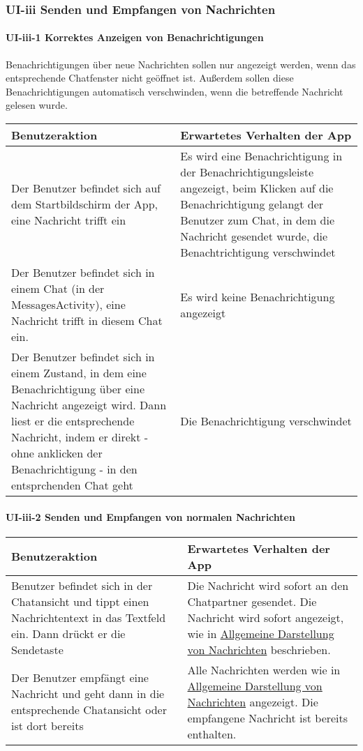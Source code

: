 
\clearpage
\subsubsection{UI-iii Senden und Empfangen von Nachrichten}

\paragraph{UI-iii-1 Korrektes Anzeigen von Benachrichtigungen}

Benachrichtigungen über neue Nachrichten sollen nur angezeigt werden, wenn das entsprechende Chatfenster nicht geöffnet ist. Außerdem sollen diese Benachrichtigungen automatisch verschwinden, wenn die betreffende Nachricht gelesen wurde.

\begin{longtable}{|p{8cm}|p{8.5cm}|}
\hline
Benutzeraktion & Erwartetes Verhalten der App\tabularnewline
\hline

Der Benutzer befindet sich auf dem Startbildschirm der App, eine
Nachricht trifft ein & Es wird eine Benachrichtigung in der
Benachrichtigungsleiste angezeigt, beim Klicken auf die Benachrichtigung
gelangt der Benutzer zum Chat, in dem die Nachricht gesendet wurde, die
Benachtrichtigung verschwindet\tabularnewline
Der Benutzer befindet sich in einem Chat (in der MessagesActivity), eine
Nachricht trifft in diesem Chat ein. & Es wird keine Benachrichtigung
angezeigt\tabularnewline
Der Benutzer befindet sich in einem Zustand, in dem eine
Benachrichtigung über eine Nachricht angezeigt wird. Dann liest er die
entsprechende Nachricht, indem er direkt - ohne anklicken der
Benachrichtigung - in den entsprchenden Chat geht & Die Benachrichtigung
verschwindet\tabularnewline
\hline
\end{longtable}

\paragraph{UI-iii-2 Senden und Empfangen von normalen Nachrichten}

\begin{longtable}{|p{8cm}|p{8.5cm}|}
\hline
Benutzeraktion & Erwartetes Verhalten der App\tabularnewline
\hline

Benutzer befindet sich in der Chatansicht und tippt einen
Nachrichtentext in das Textfeld ein. Dann drückt er die Sendetaste & Die
Nachricht wird sofort an den Chatpartner gesendet. Die Nachricht wird
sofort angezeigt, wie in
\href{Manueller-Test-UI\#allgemeine-darstellung-der-nachrichten}{Allgemeine
Darstellung von Nachrichten} beschrieben.\tabularnewline
Der Benutzer empfängt eine Nachricht und geht dann in die entsprechende
Chatansicht oder ist dort bereits & Alle Nachrichten werden wie in
\href{Manueller-Test-UI\#allgemeine-darstellung-der-nachrichten}{Allgemeine
Darstellung von Nachrichten} angezeigt. Die empfangene Nachricht ist
bereits enthalten.\tabularnewline
\hline
\end{longtable}

